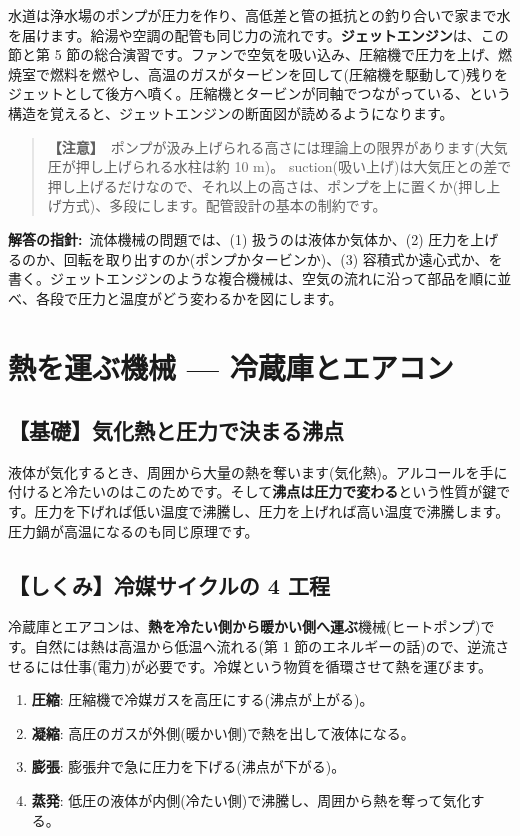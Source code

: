 \documentclass{article}
\begin{document}
水道は浄水場のポンプが圧力を作り、高低差と管の抵抗との釣り合いで家まで水を届けます。給湯や空調の配管も同じ力の流れです。\textbf{ジェットエンジン}は、この節と第 5 節の総合演習です。ファンで空気を吸い込み、圧縮機で圧力を上げ、燃焼室で燃料を燃やし、高温のガスがタービンを回して(圧縮機を駆動して)残りをジェットとして後方へ噴く。圧縮機とタービンが同軸でつながっている、という構造を覚えると、ジェットエンジンの断面図が読めるようになります。

\begin{quote}
\textbf{【注意】}\ ポンプが汲み上げられる高さには理論上の限界があります(大気圧が押し上げられる水柱は約 10 m)。 suction(吸い上げ)は大気圧との差で押し上げるだけなので、それ以上の高さは、ポンプを上に置くか(押し上げ方式)、多段にします。配管設計の基本の制約です。
\end{quote}

\textbf{解答の指針:}\ 流体機械の問題では、(1) 扱うのは液体か気体か、(2) 圧力を上げるのか、回転を取り出すのか(ポンプかタービンか)、(3) 容積式か遠心式か、を書く。ジェットエンジンのような複合機械は、空気の流れに沿って部品を順に並べ、各段で圧力と温度がどう変わるかを図にします。

\section{熱を運ぶ機械 — 冷蔵庫とエアコン}

\subsection{【基礎】気化熱と圧力で決まる沸点}

液体が気化するとき、周囲から大量の熱を奪います(気化熱)。アルコールを手に付けると冷たいのはこのためです。そして\textbf{沸点は圧力で変わる}という性質が鍵です。圧力を下げれば低い温度で沸騰し、圧力を上げれば高い温度で沸騰します。圧力鍋が高温になるのも同じ原理です。

\subsection{【しくみ】冷媒サイクルの 4 工程}

冷蔵庫とエアコンは、\textbf{熱を冷たい側から暖かい側へ運ぶ}機械(ヒートポンプ)です。自然には熱は高温から低温へ流れる(第 1 節のエネルギーの話)ので、逆流させるには仕事(電力)が必要です。冷媒という物質を循環させて熱を運びます。

\begin{enumerate}
\item \textbf{圧縮}: 圧縮機で冷媒ガスを高圧にする(沸点が上がる)。
\item \textbf{凝縮}: 高圧のガスが外側(暖かい側)で熱を出して液体になる。
\item \textbf{膨張}: 膨張弁で急に圧力を下げる(沸点が下がる)。
\item \textbf{蒸発}: 低圧の液体が内側(冷たい側)で沸騰し、周囲から熱を奪って気化する。
\end{enumerate}
\end{document}
